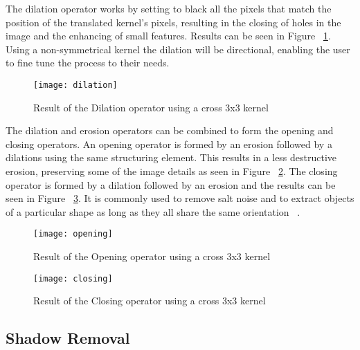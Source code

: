 The dilation operator works by setting to black all the pixels that match the position of the translated kernel's pixels, resulting in the closing of holes in the image and the enhancing of small features. Results can be seen in Figure ~\ref{fig:dilation}. Using a non-symmetrical kernel the dilation will be directional, enabling the user to fine tune the process to their needs.

\begin{figure}[h]
  \begin{center}
    \leavevmode
    \texttt{[image: dilation]}
    \captionsetup{justification=centering}
    \caption{Result of the Dilation operator using a cross 3x3 kernel}
    \label{fig:dilation}
  \end{center}
\end{figure}

The dilation and erosion operators can be combined to form the opening and closing operators. An opening operator is formed by an erosion followed by a dilations using the same structuring element. This results in a less destructive erosion, preserving some of the image details as seen in Figure ~\ref{fig:opening}. The closing operator is formed by a dilation followed by an erosion and the results can be seen in Figure ~\ref{fig:closing}. It is commonly used to remove salt noise and to extract objects of a particular shape as long as they all share the same orientation ~\cite{fisher_morphology_2003}.

\begin{figure}[H]
  \begin{center}
    \leavevmode
    \texttt{[image: opening]}
    \captionsetup{justification=centering}
    \caption{Result of the Opening operator using a cross 3x3 kernel}
    \label{fig:opening}
  \end{center}
\end{figure}

\begin{figure}[H]
  \begin{center}
    \leavevmode
    \texttt{[image: closing]}
    \captionsetup{justification=centering}
    \caption{Result of the Closing operator using a cross 3x3 kernel}
    \label{fig:closing}
  \end{center}
\end{figure}

\subsection{Shadow Removal}

